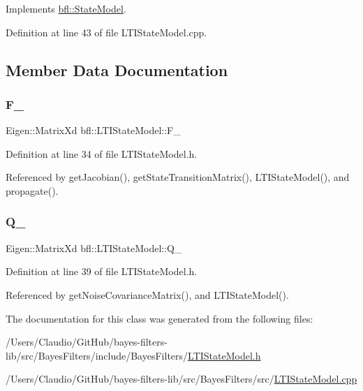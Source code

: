 Implements \mbox{\hyperlink{classbfl_1_1StateModel_ac86dcdad8f0bbfab39a23e592779feaa}{bfl\+::\+State\+Model}}.



Definition at line 43 of file L\+T\+I\+State\+Model.\+cpp.



\subsection{Member Data Documentation}
\mbox{\label{classbfl_1_1LTIStateModel_afd54044a09d67c9eb0c7777d3a248aa5}} 
\subsubsection{\texorpdfstring{F\+\_\+}{F\_}}
{\footnotesize\ttfamily Eigen\+::\+Matrix\+Xd bfl\+::\+L\+T\+I\+State\+Model\+::\+F\+\_\+\hspace{0.3cm}{\ttfamily [protected]}}



Definition at line 34 of file L\+T\+I\+State\+Model.\+h.



Referenced by get\+Jacobian(), get\+State\+Transition\+Matrix(), L\+T\+I\+State\+Model(), and propagate().

\mbox{\label{classbfl_1_1LTIStateModel_a8c0ec09b52b65246415b1483624959b7}} 
\subsubsection{\texorpdfstring{Q\+\_\+}{Q\_}}
{\footnotesize\ttfamily Eigen\+::\+Matrix\+Xd bfl\+::\+L\+T\+I\+State\+Model\+::\+Q\+\_\+\hspace{0.3cm}{\ttfamily [protected]}}



Definition at line 39 of file L\+T\+I\+State\+Model.\+h.



Referenced by get\+Noise\+Covariance\+Matrix(), and L\+T\+I\+State\+Model().



The documentation for this class was generated from the following files\+:\begin{DoxyCompactItemize}
\item 
/\+Users/\+Claudio/\+Git\+Hub/bayes-\/filters-\/lib/src/\+Bayes\+Filters/include/\+Bayes\+Filters/\mbox{\hyperlink{LTIStateModel_8h}{L\+T\+I\+State\+Model.\+h}}\item 
/\+Users/\+Claudio/\+Git\+Hub/bayes-\/filters-\/lib/src/\+Bayes\+Filters/src/\mbox{\hyperlink{LTIStateModel_8cpp}{L\+T\+I\+State\+Model.\+cpp}}\end{DoxyCompactItemize}
